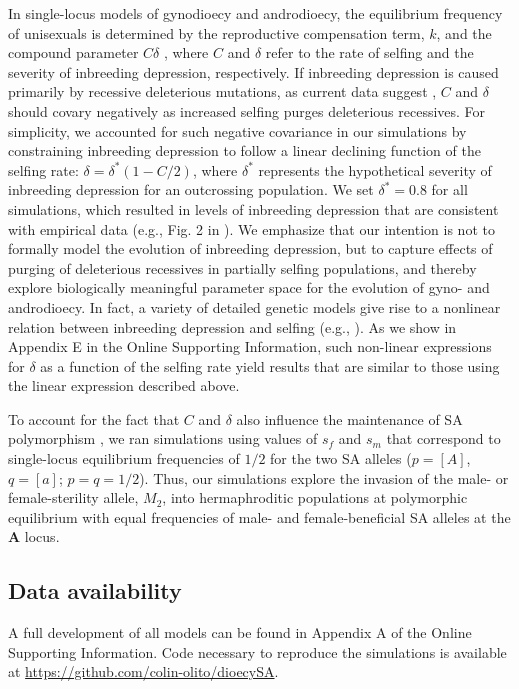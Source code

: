 \documentclass{article}
\begin{document}
In single-locus models of gynodioecy and androdioecy, the equilibrium frequency of unisexuals is determined by the reproductive compensation term, $k$, and the compound parameter $C \delta$ \citep{Charlesworth1978a}, where $C$ and $\delta$ refer to the rate of selfing and the severity of inbreeding depression, respectively. If inbreeding depression is caused primarily by recessive deleterious mutations, as current data suggest \citep{Charlesworth2009}, $C$ and $\delta$ should covary negatively as increased selfing purges deleterious recessives. For simplicity, we accounted for such negative covariance in our simulations by constraining inbreeding depression to follow a linear declining function of the selfing rate: $\delta = \delta^\ast(1 - C/2)$, where $\delta^\ast$ represents the hypothetical severity of inbreeding depression for an outcrossing population. We set $\delta^\ast = 0.8$ for all simulations, which resulted in levels of inbreeding depression that are consistent with empirical data (e.g., Fig. 2 in \citealt{HusbandSchemske1996}). We emphasize that our intention is not to formally model the evolution of inbreeding depression, but to capture effects of purging of deleterious recessives in partially selfing populations, and thereby explore biologically meaningful parameter space for the evolution of gyno- and androdioecy. In fact, a variety of detailed genetic models give rise to a nonlinear relation between inbreeding depression and selfing (e.g., \citealt{OhtaCockerham1974, LandeSchemske1985, Charlesworth1985, Garcia-Dorado2017, LandePorcher2017}). As we show in Appendix E in the Online Supporting Information, such non-linear expressions for $\delta$ as a function of the selfing rate yield results that are similar to those using the linear expression described above. 

To account for the fact that $C$ and $\delta$ also influence the maintenance of SA polymorphism \citep{JordanConnallon2014,Olito2016}, we ran simulations using values of $s_f$ and $s_m$ that correspond to single-locus equilibrium frequencies of $1/2$ for the two SA alleles ($p = [A]$, $q = [a]$; $p=q=1/2$). Thus, our simulations explore the invasion of the male- or female-sterility allele, $M_2$, into hermaphroditic populations at polymorphic equilibrium with equal frequencies of male- and female-beneficial SA alleles at the $\mathbf{A}$ locus.


\subsection*{Data availability}
A full development of all models can be found in Appendix A of the Online Supporting Information. Code necessary to reproduce the simulations is available at \url{https://github.com/colin-olito/dioecySA}.
\end{document}
